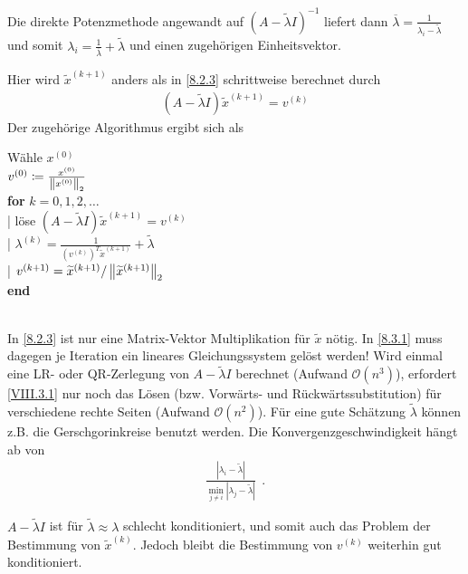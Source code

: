
Die direkte Potenzmethode angewandt auf
$(A-\widetilde{\lambda}I)^{-1}$
liefert dann
$\overline{\lambda}=\frac{1}{\lambda_i-\widetilde{\lambda}}$
und somit $\lambda_i=\frac{1}{\overline{\lambda}}+\widetilde{\lambda}$
und einen zugehörigen Einheitsvektor.


\label{8.3.1}
Hier wird $\widetilde{x}^{(k+1)}$ anders als in \ref{8.2.3}
schrittweise berechnet durch
\begin{gather}
  (A-\widetilde{\lambda}I)\widetilde{x}^{(k+1)}=v^{(k)}
\label{VIII.3.1}
\end{gather}
Der zugehörige Algorithmus ergibt sich als

\begin{pseudocode}{0.5\linewidth}
  Wähle $x^{(0)}$ \\
  $v^{(0)} \coloneqq \frac{x^{(0)}}{\nn[x^{(0)}]_2} $\\
  \textbf{for} $k=0,1,2,\ldots$ \\
  |\> löse
  $(A-\widetilde{\lambda}I)\widetilde{x}^{(k+1)}=v^{(k)}$\\
  |\> $\lambda^{(k)} = \frac{1}{\left(v^{(k)}\right)^T \widetilde{x}^{(k+1)}}
    + \widetilde{\lambda}$\\
  |\> $v^{(k+1)} = \widetilde{x}^{(k+1)}/\nn[\widetilde{x}^{(k+1)}]_2$\\
  \textbf{end}
\end{pseudocode}\\

In \ref{8.2.3} ist nur eine Matrix-Vektor Multiplikation für
$\widetilde{x}$ nötig.
In \ref{8.3.1} muss dagegen je Iteration ein lineares Gleichungssystem
gelöst werden!
Wird einmal eine LR- oder QR-Zerlegung von $A-\widetilde{\lambda}I$
berechnet (Aufwand $\mathcal{O}(n^3)$), 
erfordert \eqref{VIII.3.1} nur noch das Lösen
(bzw. Vorwärts- und Rückwärtssubstitution)
für verschiedene rechte Seiten (Aufwand $\mathcal{O}(n^2)$).
Für eine gute Schätzung $\widetilde{\lambda}$ können 
z.B. die Gerschgorinkreise benutzt werden.
Die Konvergenzgeschwindigkeit hängt ab von
\begin{gather*}
  \frac{\left| \lambda_i-\widetilde{\lambda}\right|}
  {\min_{j\neq i} \left| \lambda_j-\widetilde{\lambda}\right|}~~.
\end{gather*}

\begin{Beme}\label{8.3.2}\cite[siehe][]{deuflhardhohmann}
$A-\widetilde{\lambda}I$ ist für $\widetilde{\lambda}\approx\lambda$
schlecht konditioniert, und somit auch das Problem
der Bestimmung von $\widetilde{x}^{(k)}$.
Jedoch bleibt die Bestimmung von $v^{(k)}$ weiterhin gut
konditioniert.  
\end{Beme}





